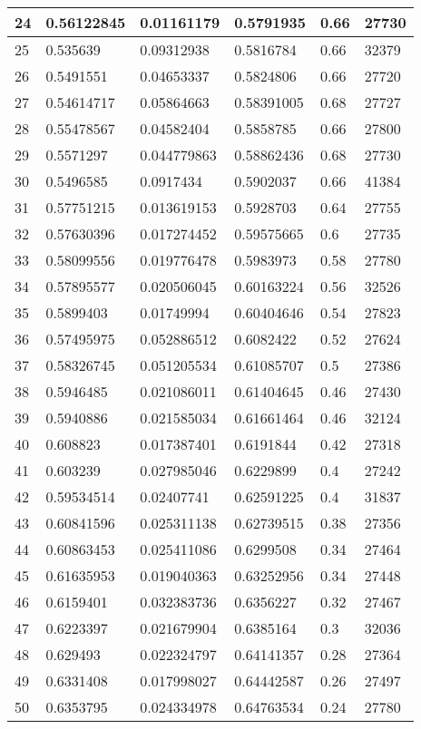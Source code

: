 \begin{longtable}{|l|l|l|l|l|l|}
24 & 0.56122845 & 0.01161179 & 0.5791935 & 0.66 & 27730 \\ \hline 
25 & 0.535639 & 0.09312938 & 0.5816784 & 0.66 & 32379 \\ \hline 
26 & 0.5491551 & 0.04653337 & 0.5824806 & 0.66 & 27720 \\ \hline 
27 & 0.54614717 & 0.05864663 & 0.58391005 & 0.68 & 27727 \\ \hline 
28 & 0.55478567 & 0.04582404 & 0.5858785 & 0.66 & 27800 \\ \hline 
29 & 0.5571297 & 0.044779863 & 0.58862436 & 0.68 & 27730 \\ \hline 
30 & 0.5496585 & 0.0917434 & 0.5902037 & 0.66 & 41384 \\ \hline 
31 & 0.57751215 & 0.013619153 & 0.5928703 & 0.64 & 27755 \\ \hline 
32 & 0.57630396 & 0.017274452 & 0.59575665 & 0.6 & 27735 \\ \hline 
33 & 0.58099556 & 0.019776478 & 0.5983973 & 0.58 & 27780 \\ \hline 
34 & 0.57895577 & 0.020506045 & 0.60163224 & 0.56 & 32526 \\ \hline 
35 & 0.5899403 & 0.01749994 & 0.60404646 & 0.54 & 27823 \\ \hline 
36 & 0.57495975 & 0.052886512 & 0.6082422 & 0.52 & 27624 \\ \hline 
37 & 0.58326745 & 0.051205534 & 0.61085707 & 0.5 & 27386 \\ \hline 
38 & 0.5946485 & 0.021086011 & 0.61404645 & 0.46 & 27430 \\ \hline 
39 & 0.5940886 & 0.021585034 & 0.61661464 & 0.46 & 32124 \\ \hline 
40 & 0.608823 & 0.017387401 & 0.6191844 & 0.42 & 27318 \\ \hline 
41 & 0.603239 & 0.027985046 & 0.6229899 & 0.4 & 27242 \\ \hline 
42 & 0.59534514 & 0.02407741 & 0.62591225 & 0.4 & 31837 \\ \hline 
43 & 0.60841596 & 0.025311138 & 0.62739515 & 0.38 & 27356 \\ \hline 
44 & 0.60863453 & 0.025411086 & 0.6299508 & 0.34 & 27464 \\ \hline 
45 & 0.61635953 & 0.019040363 & 0.63252956 & 0.34 & 27448 \\ \hline 
46 & 0.6159401 & 0.032383736 & 0.6356227 & 0.32 & 27467 \\ \hline 
47 & 0.6223397 & 0.021679904 & 0.6385164 & 0.3 & 32036 \\ \hline 
48 & 0.629493 & 0.022324797 & 0.64141357 & 0.28 & 27364 \\ \hline 
49 & 0.6331408 & 0.017998027 & 0.64442587 & 0.26 & 27497 \\ \hline 
50 & 0.6353795 & 0.024334978 & 0.64763534 & 0.24 & 27780 \\ \hline 
\end{longtable}